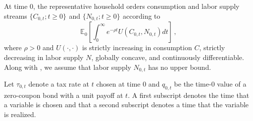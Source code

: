 \documentclass[12pt]{article}
\begin{document}
At time $0$, the representative household orders   consumption  and labor supply streams $\{C_{0, t}; t\geq 0\}_{}$ and
$\{N_{0, t}; t\geq 0\}_{}$ according to
\begin{equation}\label{utility}
	\mathbb{E}_0 \left[\int_{0}^{\infty}  e^{-\rho t} {U(C_{0, t}, N_{0, t}) }dt\right]\, , 
\end{equation}
where $\rho>0$ and $U(\cdot, \cdot)$ is strictly increasing in consumption $C$, strictly decreasing in labor supply $N$, globally concave, and continuously differentiable.  Along with \citet*{debortoli2021optimal}, we assume that labor supply $N_{0, t}$ has  no upper bound. 




Let $\tau_{0, t}$  denote a tax rate at $t$ chosen at time 0 and   $q_{0, t}$ be the time-0 value of a zero-coupon bond with a unit payoff at $t$. %
A first  subscript  denotes the  time that a  variable is chosen and that a  second subscript denotes a time that the variable is realized. 
\end{document}
